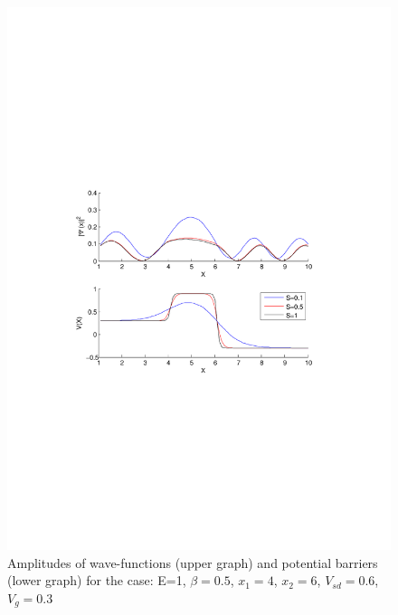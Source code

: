 \documentclass[a4paper]{article}
\begin{document}
\begin{figure}[h!]
\centering
\includegraphics[width=4.5in, trim = 0mm 100mm 0mm 100mm, clip]{test2}
\caption{Amplitudes of wave-functions (upper graph) and potential barriers (lower graph) for the case: E=1, $\beta=0.5$, $x_1=4$, $x_2=6$, $V_{sd}=0.6$, $V_g=0.3$}
\label{fig:test2}
\end{figure}
\newpage
\end{document}
